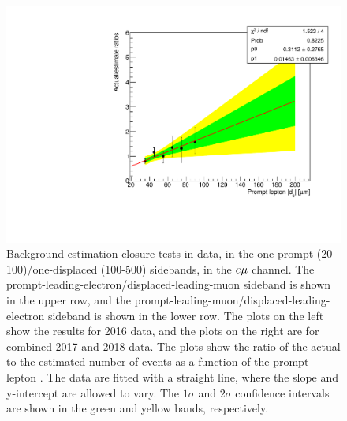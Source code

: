 \begin{figure}[hbtp]
\includegraphics[scale=0.35]{figures/bg/emu_data_2017_2018_displacedElectron_ratiosVsPromptD0.pdf}
\caption{Background estimation closure tests in data, in the one-prompt (20--100\mum)/one-displaced (100-500\mum) sidebands, in the $e{\mu}$ channel. The prompt-leading-electron/displaced-leading-muon sideband is shown in the upper row, and the prompt-leading-muon/displaced-leading-electron sideband is shown in the lower row. The plots on the left show the results for 2016 data, and the plots on the right are for combined 2017 and 2018 data. The plots show the ratio of the actual to the estimated number of events as a function of the prompt lepton \ad. The data are fitted with a straight line, where the slope and y-intercept are allowed to vary. The $1\sigma$ and $2\sigma$ confidence intervals are shown in the green and yellow bands, respectively.}
\label{100to500um_fits_emu}
\end{figure}


